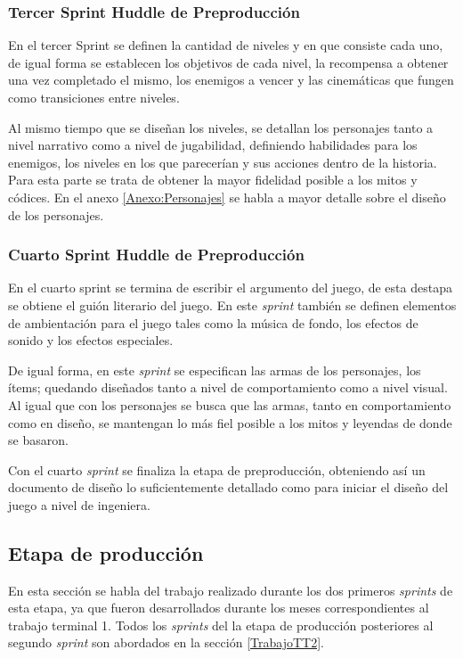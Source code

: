 \subsubsection{Tercer Sprint Huddle de Preproducción}
En el tercer Sprint se definen la cantidad de niveles y en que consiste
cada uno, de igual forma se establecen los objetivos de cada nivel, la recompensa 
a obtener una vez completado el mismo, los enemigos a vencer y las cinemáticas que 
fungen como transiciones entre niveles.  
\\
\par
Al mismo tiempo que se diseñan los niveles, se detallan los 
personajes tanto a nivel narrativo como a nivel de jugabilidad, definiendo habilidades 
para los enemigos, los niveles en los que parecerían y sus acciones dentro de 
la historia. Para esta parte se trata de obtener la mayor fidelidad posible a 
los mitos y códices. En el anexo \ref{Anexo:Personajes} se habla a mayor detalle 
sobre el diseño de los personajes.

\subsubsection{Cuarto Sprint Huddle de Preproducción} 
En el cuarto sprint se termina de escribir el argumento del juego, de esta 
destapa se obtiene el guión literario del juego. En este \textit{sprint} también se definen 
elementos de ambientación para el juego tales como la música de fondo, los 
efectos de sonido y los efectos especiales. 
\\
\par
De igual forma, en este \textit{sprint} se especifican las armas de los personajes, los 
ítems; quedando diseñados tanto a nivel de comportamiento como a nivel 
visual. Al igual que con los personajes se busca que las armas, tanto en 
comportamiento como en diseño, se mantengan lo más fiel posible a los mitos 
y leyendas de donde se basaron.
\\
\par
Con el cuarto \textit{sprint} se finaliza la etapa de preproducción, obteniendo así un 
documento de diseño lo suficientemente detallado como para iniciar el diseño 
del juego a nivel de ingeniera. 

\subsection{Etapa de producción}
En esta sección se habla del trabajo realizado durante los dos primeros 
\textit{sprints} de esta etapa, ya que fueron desarrollados durante los meses 
correspondientes al trabajo terminal 1. Todos los \textit{sprints} del la etapa 
de producción posteriores al segundo \textit{sprint} son abordados en la sección 
\ref{TrabajoTT2}.

